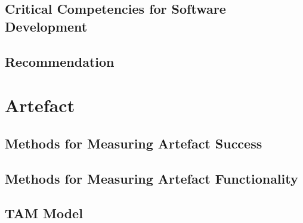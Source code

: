 \subsection{Critical Competencies for Software Development}
\subsection{Recommendation}
\section{Artefact}
\subsection{Methods for Measuring Artefact Success}
\subsection{Methods for Measuring Artefact Functionality}
\subsection{TAM Model}